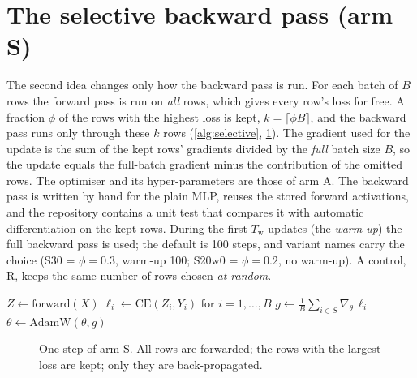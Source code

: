 \section{The selective backward pass (arm S)}\label{sec:selective}
The second idea changes only how the backward pass is run. For each batch of $B$ rows the forward pass is run on \emph{all} rows, which gives every row's loss for free. A fraction $\phi$ of the rows with the highest loss is kept, $k=\lceil\phi B\rceil$, and the backward pass runs only through these $k$ rows (\cref{alg:selective}, \cref{fig:selective}). The gradient used for the update is the sum of the kept rows' gradients divided by the \emph{full} batch size $B$, so the update equals the full-batch gradient minus the contribution of the omitted rows. The optimiser and its hyper-parameters are those of arm A. The backward pass is written by hand for the plain MLP, reuses the stored forward activations, and the repository contains a unit test that compares it with automatic differentiation on the kept rows. During the first $T_{\mathrm{w}}$ updates (the \emph{warm-up}) the full backward pass is used; the default is 100 steps, and variant names carry the choice (S30 = $\phi{=}0.3$, warm-up 100; S20w0 = $\phi{=}0.2$, no warm-up). A control, R, keeps the same number of rows chosen \emph{at random}.

\begin{algorithm}[t]
\caption{One update of the selective backward pass (arm S)}\label{alg:selective}
\DontPrintSemicolon
{}
$Z \leftarrow \text{forward}(X)$ 
$\ell_i \leftarrow \mathrm{CE}(Z_i, Y_i)$ for $i=1,\dots,B$\;
$g \leftarrow \tfrac1B \sum_{i\in S}\nabla_\theta\, \ell_i$ 
$\theta \leftarrow \mathrm{AdamW}(\theta, g)$\;
\end{algorithm}

\begin{figure}[t]
\centering
\resizebox{\textwidth}{!}{}
\caption{One step of arm S. All rows are forwarded; the rows with the largest loss are kept; only they are back-propagated.}
\label{fig:selective}
\end{figure}

